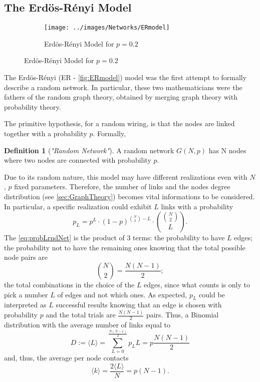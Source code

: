 \documentclass[a4paper,10pt,twoside]{book} %
\theoremstyle{definition}
\newtheorem{definition}{Definition}[section]
\begin{document}
\subsection{The Erdös-Rényi Model}
\label{sec:ER_model}

\begin{figure}[ht]
    \begin{subfigure}{\textwidth}
        \texttt{[image: ../images/Networks/ERmodel]}
        \centering
        \caption{Erdös-Rényi Model for $p = 0.2$ \cite{Baronchelli:2017_EpidSpreadCompNets}}
        \label{fig:ERmodel}
    \end{subfigure}
\end{figure}

The Erdös-Rényi (ER - \autoref{fig:ERmodel}) model was the first attempt to formally describe a random network. 
In particular, these two mathematicians were the fathers of the random graph theory, obtained by merging graph theory with probability theory.

The primitive hypothesis, for a random wiring, is that the nodes are linked together with a probability $p$. Formally,

\begin{definition}[\textit{"Random Network"}]
A random network $G(N,p)$ has N nodes where two nodes are connected with probability $p$.
\end{definition} 

Due to its random nature, this model may have different realizations even with $N$, $p$ fixed parameters. Therefore, the number of links and the nodes degree distribution (see \autoref{sec:GraphTheory}) becomes vital informations to be considered.
In particular, a specific realization could exhibit $L$ links with a probability
\begin{equation}
	\label{eq:probLrndNet}
	p_L = p^L \cdot (1-p)^{ \binom{N}{2} - L } \cdot \binom{\binom{N}{2}}{L}.
\end{equation}
The \autoref{eq:probLrndNet} is the product of $3$ terms: the probability to have $L$ edges; the probability not to have the remaining ones knowing that the total possible node pairs are \[ \binom{N}{2} = \frac{N(N-1)}{2}; \] the total combinations in the choice of the $L$ edges, since what counts is only to pick a number $L$ of edges and not which ones.
As expected, $p_L$ could be interpreted as $L$ successful results knowing that an edge is chosen with probability $p$ and the total trials are $\frac{N(N-1)}{2}$ pairs. Thus, a Binomial distribution with the average number of links equal to
\[ D:= \langle L \rangle = \sum_{L = 0}^{\frac{N(N-1)}{2}} p_L L = p\frac{N(N-1)}{2} \label{eq:meanL} \] and, thus, the average per node contacts \[ \langle k\rangle = \frac{2\langle L \rangle}{N} = p(N-1) \label{eq:meank}. \]
\end{document}

